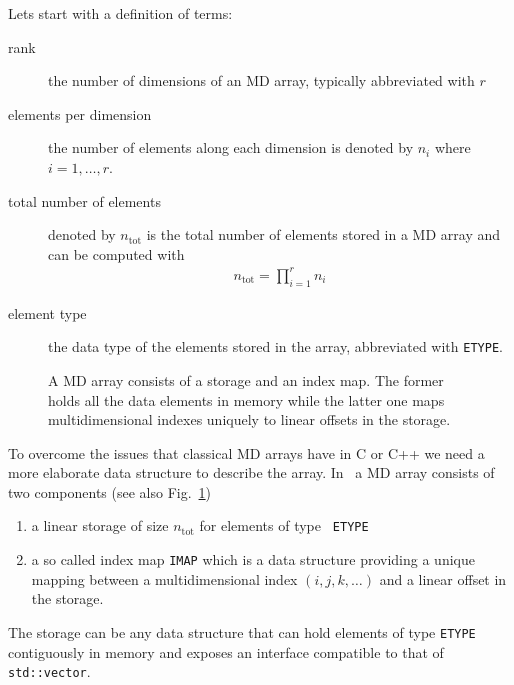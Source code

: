 Lets start with a definition of terms:
\begin{description}
\item[rank] the number of dimensions of an MD array, typically abbreviated with
$r$
\item[elements per dimension] the number of elements along each dimension is
denoted by $n_i$ where $i=1,\hdots,r$.
\item[total number of elements] denoted by $n_{\mathrm{tot}}$ is the total
number of elements stored in a MD array and can be computed with 
\begin{align}
    n_{\mathrm{tot}} = \prod_{i=1}^r n_i
\end{align}
\item[element type] the data type of the elements stored in the array,
abbreviated with {\tt ETYPE}. 
\end{description}

\begin{figure}[tb]
\centering
\begin{minipage}[c]{0.55\linewidth}
\centering
{}
\end{minipage}
\hfill
\begin{minipage}[c]{0.39\linewidth}
\caption{{\small\label{fig:array_app:basic_structure} A MD array consists of a
storage and an index map. The former holds all the data elements in memory while
the latter one maps multidimensional indexes uniquely to linear offsets in the
storage.
}}
\end{minipage}
\end{figure}
To overcome the issues that classical MD arrays have in C or C++ we need a more
elaborate data structure to describe the array. In \libpnicore\ a MD array
consists of two components (see also Fig.~\ref{fig:array_app:basic_structure})
\begin{enumerate}
\item a linear storage of size $n_{\mathrm{tot}}$ for elements of type {\tt
ETYPE}
\item a so called index map {\tt IMAP} which is a data structure providing a
unique mapping between a multidimensional index $(i,j,k,\hdots)$ and a linear
offset in the storage. 
\end{enumerate}
The storage can be any data structure that can hold elements of type {\tt ETYPE}
contiguously in memory and exposes an interface compatible to that of {\tt std::vector}.

